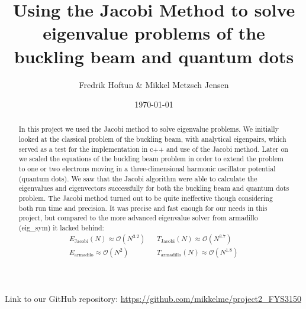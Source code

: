 \documentclass[american,a4paper,12pt]{article}
\title{Using the Jacobi Method to solve eigenvalue problems of the buckling beam and quantum dots}
\author{Fredrik Hoftun \& Mikkel Metzsch Jensen}
\date{\today}
\begin{document}
\maketitle

\begin{abstract}
    In this project we used the Jacobi method to solve eigenvalue problems. We initially looked at the classical problem of the buckling beam, with analytical eigenpairs, which served as a test for the implementation in c++ and use of the Jacobi method. Later on we scaled the equations of the buckling beam problem in order to extend the problem to one or two electrons moving in a three-dimensional harmonic oscillator potential (quantum dots). We saw that the Jacobi algorithm were able to calculate the eigenvalues and eigenvectors successfully for both the buckling beam and quantum dots problem. The Jacobi method turned out to be quite ineffective though considering both run time and precision. It was precise and fast enough for our needs in this project, but compared to the more advanced eigenvalue solver from armadillo (eig\_sym) it lacked behind:
    \begin{align*}
        &E_{\text{Jacobi}}(N) \approx \mathcal{O}(N^{3.2})&  &T_{\text{Jacobi}}(N) \approx \mathcal{O}(N^{3.7})& \\
        &E_{\text{armadilo}} \approx \mathcal{O}(N^{2})& &T_{\text{armadillo}}(N) \approx \mathcal{O}(N^{1.8})&
    \end{align*}


\end{abstract}
\vfill
\footnotesize{{Link to our GitHub repository: \url{https://github.com/mikkelme/project2_FYS3150}}} 
\newpage
\end{document}
